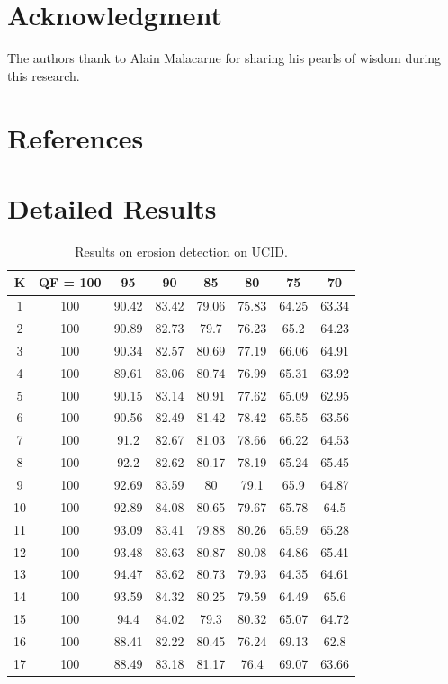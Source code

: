 \documentclass[review]{elsarticle}
\begin{document}
\section*{Acknowledgment}
The authors thank to Alain Malacarne for sharing his pearls of wisdom during this research. 

\section*{References}


\appendix
\section{Detailed Results}
\label{app:detailed_compress}

	\begin{longtable}{c|ccccccc}
		\caption{Results on erosion detection on UCID.}
		\label{table:uciderosion}	\\
		\hline\hline
		\textbf{K}&\textbf{QF = 100}&\textbf{95}&\textbf{90}&\textbf{85}&\textbf{80}&\textbf{75}&\textbf{70}\\
		\hline
		1&100&90.42&83.42&79.06&75.83&64.25&63.34\\
		2&100&90.89&82.73&79.7&76.23&65.2&64.23\\
		3&100&90.34&82.57&80.69&77.19&66.06&64.91\\
		4&100&89.61&83.06&80.74&76.99&65.31&63.92\\
		5&100&90.15&83.14&80.91&77.62&65.09&62.95\\
		6&100&90.56&82.49&81.42&78.42&65.55&63.56\\
		7&100&91.2&82.67&81.03&78.66&66.22&64.53\\
		8&100&92.2&82.62&80.17&78.19&65.24&65.45\\
		9&100&92.69&83.59&80&79.1&65.9&64.87\\
		10&100&92.89&84.08&80.65&79.67&65.78&64.5\\
		11&100&93.09&83.41&79.88&80.26&65.59&65.28\\
		12&100&93.48&83.63&80.87&80.08&64.86&65.41\\
		13&100&94.47&83.62&80.73&79.93&64.35&64.61\\
		14&100&93.59&84.32&80.25&79.59&64.49&65.6\\
		15&100&94.4&84.02&79.3&80.32&65.07&64.72\\
		16&100&88.41&82.22&80.45&76.24&69.13&62.8\\
		17&100&88.49&83.18&81.17&76.4&69.07&63.66\\

\end{longtable}
\end{document}
